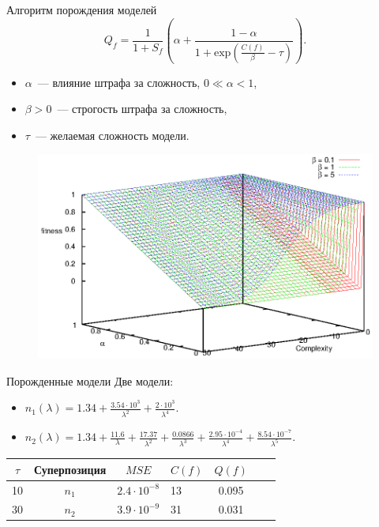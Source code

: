\documentclass{beamer}
\begin{document}
\begin{frame}{Алгоритм порождения моделей}
  \[
    Q_f = \frac{1}{1 + S_f} \left(\alpha + \frac{1 - \alpha}{1 + \text{exp} (\frac{C(f)}{\beta} - \tau)}\right).
  \]
  \begin{itemize}
    \item $\alpha$~--- влияние штрафа за сложность, $0 \ll \alpha < 1$,
    \item $\beta > 0$~--- строгость штрафа за сложность,
    \item $\tau$~--- желаемая сложность модели.
  \end{itemize}

  \begin{figure}[h]
    \vspace{-20pt}
    \includegraphics[scale=0.5]{figs/fitness.eps}
    \vspace{-30pt}
  \end{figure}
\end{frame}

\begin{frame}{Порожденные модели}
  Две модели:
  \begin{itemize}
    \item $n_1(\lambda) = 1.34 + \frac{3.54 \cdot 10^3}{\lambda^2} + \frac{2 \cdot 10^3}{\lambda^4}$.
    \item $n_2(\lambda) = 1.34 + \frac{11.6}{\lambda} + \frac{17.37}{\lambda^2} + \frac{0.0866}{\lambda^3} + \frac{2.95 \cdot 10^{-4}}{\lambda^4} + \frac{8.54 \cdot 10^{-7}}{\lambda^5}.$
  \end{itemize}
  
  \begin{table}[h]
    \centering
    \begin{tabular}{| c | c | c | l | c | c | c |} \hline
  	$\tau$	& Суперпозиция		& $MSE$					& $C(f)$		& $Q(f)$ \\ \hline
	10	  	& $n_1$		  		& $2.4 \cdot 10^{-8}$	& 13			& 0.095	\\ \hline
	30		& $n_2$				& $3.9 \cdot 10^{-9}$	& 31			& 0.031	\\ \hline
    \end{tabular}
  \end{table}
\end{frame}
\end{document}
